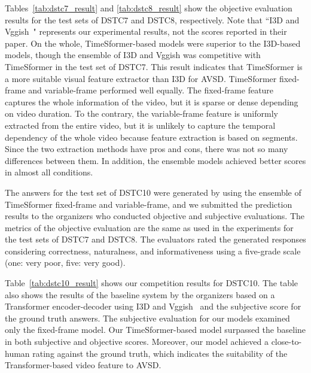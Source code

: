 \documentclass[letterpaper]{article} %
\begin{document}
Tables~\ref{tab:dstc7_result} and \ref{tab:dstc8_result} show the objective evaluation results for the test sets of DSTC7 and DSTC8, respectively.
Note that ``I3D and Vggish~\cite{Li2021bridging}" represents our experimental results, not the scores reported in their paper.
On the whole, TimeSformer-based models were superior to the I3D-based models, though the ensemble of I3D and Vggish was competitive with TimeSformer in the test set of DSTC7.
This result indicates that TimeSformer is a more suitable visual feature extractor than I3D for AVSD.
TimeSformer fixed-frame and variable-frame performed well equally.
The fixed-frame feature captures the whole information of the video, but it is sparse or dense depending on video duration.
To the contrary, the variable-frame feature is uniformly extracted from the entire video, but it is unlikely to capture the temporal dependency of the whole video because feature extraction is based on segments.
Since the two extraction methods have pros and cons, there was not so many differences between them.
%
In addition, the ensemble models achieved better scores in almost all conditions.

The answers for the test set of DSTC10 were generated by using the ensemble of TimeSformer fixed-frame and variable-frame, and we submitted the prediction results to the organizers
%
who conducted objective and subjective evaluations.
The metrics of the objective evaluation are the same as used in the experiments for the test sets of DSTC7 and DSTC8.
The evaluators rated the generated responses considering correctness, naturalness, and informativeness using a five-grade scale (one: very poor, five: very good).

Table~\ref{tab:dstc10_result} shows our competition results for DSTC10.
The table also shows the results of the baseline system by the organizers based on a Transformer encoder-decoder using I3D and Vggish~\cite{Shah2021audio} and the subjective score for the ground truth answers.
The subjective evaluation for our models examined only the fixed-frame model.
%
Our TimeSformer-based model surpassed the baseline in both subjective and objective scores.
Moreover, our model achieved a close-to-human rating against the ground truth, which indicates the suitability of the Transformer-based video feature to AVSD.
\end{document}
